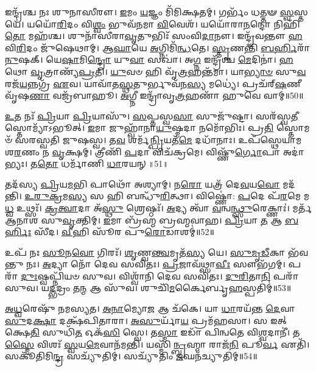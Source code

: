 𑌇𑌨𑍍𑌦𑍍𑌰᳴𑌶𑍍𑌚 𑌨𑌃 𑌶𑍁𑌨𑌾𑌸𑍀𑌰𑍗।
\-\ul{𑌇}\-𑌮𑌂 \ul{𑌯}\-𑌜𑍍𑌞𑌂 𑌮𑌿᳴𑌮𑌿𑌕𑍍𑌷𑌤𑌮𑍍।
𑌗𑌰𑍍𑌭𑌂᳴ 𑌧𑌤𑍍𑌤𑍟 \ul{𑌸𑍍𑌵}\-𑌸𑍍𑌤𑌯𑍇॑।
𑌯𑌯𑍋᳴\-\ul{𑌰𑌿}\-𑌦𑌂 𑌵𑌿\-\ul{𑌶𑍍𑌵𑌂} 𑌭𑍁𑌵᳴𑌨𑌮𑌾 \ul{𑌵𑌿}\-𑌵𑍇𑌶᳴।
𑌯𑌯𑍋᳴𑌰𑌾\-\ul{𑌨}\-𑌨𑍍𑌦𑍋 𑌨𑌿𑌹𑌿᳴\-\ul{𑌤𑍋} 𑌮𑌹᳴𑌶𑍍𑌚।
𑌶𑍁𑌨𑌾᳴𑌸𑍀𑌰𑌾\-\ul{𑌵𑍃}\-𑌤𑍁𑌭𑌿𑌃᳴ 𑌸𑌂𑌵𑌿\-\ul{𑌦𑌾}\-𑌨𑍗।
𑌇𑌨𑍍𑌦𑍍𑌰᳴𑌵𑌨𑍍𑌤𑍗 \ul{𑌹}\-𑌵𑌿\-\ul{𑌰𑌿}\-𑌦𑌂 𑌜𑍁᳴𑌷𑍇𑌥𑌾𑌮𑍍।
𑌆\-\ul{𑌘𑌾}\-𑌯𑍇 \ul{𑌅}\-𑌗𑍍𑌨𑌿𑌮𑌿᳴\-\ul{𑌨𑍍𑌧}\-𑌤𑍇।
\-\ul{𑌸𑍍𑌤𑍃}\-𑌣𑌨𑍍𑌤𑌿᳴ \ul{𑌬}\-\-\ul{𑌰𑍍}\-𑌹𑌿𑌰𑌾᳴\-\ul{𑌨𑍁}\-𑌷𑌕𑍍।
𑌯𑍇\-\ul{𑌷𑌾}\-𑌮𑌿\-\ul{𑌨𑍍𑌦𑍍𑌰𑍋} 𑌯𑍁\-\ul{𑌵𑌾} 𑌸𑌖𑌾॑।
𑌅\-\ul{𑌗𑍍𑌨} 𑌇𑌨𑍍𑌦𑍍𑌰᳴𑌶𑍍𑌚 \ul{𑌮𑍇}\-𑌦𑌿𑌨𑌾॑।
\-\ul{𑌹}\-𑌥𑍋 \ul{𑌵𑍃}\-𑌤𑍍𑌰𑌾𑌣𑍍𑌯᳴\-\ul{𑌪𑍍𑌰}\-𑌤𑌿।
\-\ul{𑌯𑍁}\-𑌵𑍞 𑌹𑌿 𑌵𑍃᳴\-\ul{𑌤𑍍𑌰}\-𑌹𑌨𑍍𑌤᳴𑌮𑌾।
𑌯𑌾\-\ul{𑌭𑍍𑌯𑌾}\-\-\ul{𑍞} 𑌸𑍁\-\ul{𑌵}\-𑌰𑌜᳴\-\ul{𑌯}\-𑌨𑍍𑌨𑌗𑍍𑌰᳴ \ul{𑌏}\-𑌵।
𑌯𑌾𑌵𑌾᳴𑌤\-\ul{𑌸𑍍𑌥}\-𑌤𑍁𑌰𑍍𑌭𑍁𑌵᳴𑌨\-\ul{𑌸𑍍𑌯} 𑌮𑌧𑍍𑌯𑍇॑।
𑌪𑍍𑌰𑌚᳴𑌰𑍍‌\mbox{}\-\ul{𑌷}\-𑌣𑍀 𑌵𑍃᳴𑌷\-\ul{𑌣𑌾} 𑌵𑌜𑍍𑌰᳴𑌬𑌾𑌹𑍂।
\-\ul{𑌅}\-𑌗𑍍𑌨𑍀 𑌇𑌨𑍍𑌦𑍍𑌰𑌾᳴𑌵𑍃\-\ul{𑌤𑍍𑌰}\-𑌹𑌣𑌾᳴ 𑌹𑍁𑌵𑍇 𑌵𑌾𑌮𑍍॥50॥\anuvakamend[𑌮\-\ul{𑌨} 𑌇\-\ul{𑌨𑍍𑌦𑍍𑌰𑍋} 𑌗𑌵𑌿᳴𑌷𑍍𑌟𑌿\-\ul{𑌷𑍁} 𑌤\-\ul{𑌨𑍍𑌤𑍁𑌂} 𑌗\-\ul{𑌰𑍍𑌭}\-\-\ul{𑍞} 𑌸𑍁𑌜𑌾᳴\-\ul{𑌤𑌾𑌃} 𑌸𑌖𑌾᳴ \ul{𑌸}\-𑌪𑍍𑌤 𑌚᳴]

\-\ul{𑌉}\-𑌤 𑌨𑌃᳴ \ul{𑌪𑍍𑌰𑌿}\-𑌯𑌾 \ul{𑌪𑍍𑌰𑌿}\-𑌯𑌾𑌸𑍁᳴।
\-\ul{𑌸}\-𑌪𑍍𑌤𑌸𑍍𑌵\-\ul{𑌸𑌾} 𑌸𑍁𑌜𑍁᳴𑌷𑍍𑌟𑌾।
𑌸𑌰᳴𑌸𑍍𑌵\-\ul{𑌤𑍀} 𑌸𑍍𑌤𑍋𑌮𑍍𑌯𑌾᳴\-𑌽𑌭𑍂𑌤𑍍।
\-\ul{𑌇}\-𑌮𑌾 𑌜𑍁𑌹𑍍𑌵𑌾᳴𑌨𑌾\-\ul{𑌯𑍁}\-𑌷𑍍𑌮𑌦𑌾 𑌨𑌮𑍋᳴𑌭𑌿𑌃।
𑌪𑍍𑌰\-\ul{𑌤𑌿} 𑌸𑍍𑌤𑍋𑌮𑍞᳴ 𑌸𑌰𑌸𑍍𑌵𑌤𑌿 𑌜𑍁𑌷𑌸𑍍𑌵।
𑌤\-\ul{𑌵} 𑌶𑌰𑍍𑌮᳴\-\ul{𑌨𑍍𑌪𑍍𑌰𑌿}\-𑌯𑌤᳴\-\ul{𑌮𑍇} 𑌦𑌧𑌾᳴𑌨𑌾𑌃।
𑌉𑌪᳴𑌸𑍍𑌥𑍇𑌯𑌾𑌮 𑌶\-\ul{𑌰}\-𑌣𑌂 𑌨 \ul{𑌵𑍃}\-𑌕𑍍𑌷𑌮𑍍।
𑌤𑍍𑌰𑍀𑌣𑌿᳴ \ul{𑌪}\-𑌦𑌾 𑌵𑌿𑌚᳴𑌕𑍍𑌰𑌮𑍇।
𑌵𑌿𑌷𑍍𑌣𑍁᳴\-\ul{𑌰𑍍𑌗𑍋}\-𑌪𑌾 𑌅𑌦𑌾॑𑌭𑍍𑌯𑌃।
𑌤\-\ul{𑌤𑍋} 𑌧𑌰𑍍𑌮𑌾᳴𑌣𑌿 \ul{𑌧𑌾}\-𑌰𑌯𑌨𑍍॥51॥

𑌤𑌦᳴𑌸𑍍𑌯 \ul{𑌪𑍍𑌰𑌿}\-𑌯\-\ul{𑌮}\-𑌭𑌿 𑌪𑌾𑌥𑍋᳴ 𑌅𑌶𑍍𑌯𑌾𑌮𑍍।
𑌨\-\ul{𑌰𑍋} 𑌯𑌤𑍍𑌰᳴ 𑌦𑍇\-\ul{𑌵}\-𑌯\-\ul{𑌵𑍋} 𑌮𑌦᳴𑌨𑍍𑌤𑌿।
\-\ul{𑌉}\-\-\ul{𑌰𑍁}\-\-\ul{𑌕𑍍𑌰}\-𑌮\-\ul{𑌸𑍍𑌯} 𑌸 𑌹𑌿 𑌬𑌨𑍍𑌧𑍁᳴\-\ul{𑌰𑌿}\-𑌤𑍍𑌥𑌾।
𑌵𑌿𑌷𑍍𑌣𑍋॑: \ul{𑌪}\-𑌦𑍇 𑌪᳴\-\ul{𑌰}\-𑌮𑍇 𑌮\-\ul{𑌧𑍍𑌵} 𑌉𑌥𑍍𑌸𑌃᳴।
\-\ul{𑌕𑍍𑌰}\-\-\ul{𑌤𑍍𑌵𑌾}\-𑌦𑌾 𑌅᳴\-\ul{𑌸𑍍𑌥𑍁} 𑌶𑍍𑌰𑍇𑌷𑍍𑌠𑌃᳴।
\-\ul{𑌅}\-𑌦𑍍𑌯 𑌤𑍍𑌵𑌾᳴ \ul{𑌵}\-𑌨𑍍𑌵\-\ul{𑌨𑍍𑌥𑍍𑌸𑍁}\-𑌰𑍇𑌕𑍍𑌣𑌾𑌃॑।
𑌮𑌰𑍍𑌤᳴ 𑌆𑌨𑌾𑌶 𑌸𑍁\-\ul{𑌵𑍃}\-𑌕𑍍𑌤𑌿𑌮𑍍।
\-\ul{𑌇}\-𑌮𑌾 𑌬𑍍𑌰᳴𑌹𑍍𑌮 𑌬𑍍𑌰𑌹𑍍𑌮𑌵𑌾𑌹।
\-\ul{𑌪𑍍𑌰𑌿}\-𑌯𑌾 \ul{𑌤} 𑌆 \ul{𑌬}\-\-\ul{𑌰𑍍}\-𑌹𑌿𑌃 𑌸𑍀᳴𑌦।
\-\ul{𑌵𑍀}\-𑌹𑌿 𑌸𑍂᳴𑌰 𑌪𑍁\-\ul{𑌰𑍋}\-𑌡𑌾𑌶𑌮𑍍॑॥52॥

𑌉𑌪᳴ 𑌨𑌃 \ul{𑌸𑍂}\-𑌨\-\ul{𑌵𑍋} 𑌗𑌿𑌰𑌃᳴।
\-\ul{𑌶𑍃}\-𑌣𑍍𑌵\-\ul{𑌨𑍍𑌤𑍍𑌵}\-𑌮𑍃𑌤᳴\-\ul{𑌸𑍍𑌯} 𑌯𑍇।
\-\ul{𑌸𑍁}\-\-\ul{𑌮𑍃}\-\-\ul{𑌡𑍀}\-𑌕𑌾 𑌭᳴𑌵𑌨𑍍𑌤𑍁 𑌨𑌃।
\-\ul{𑌅}\-𑌦𑍍𑌯𑌾 𑌨𑍋᳴ 𑌦𑍇𑌵 𑌸𑌵𑌿𑌤𑌃।
\-\ul{𑌪𑍍𑌰}\-𑌜𑌾𑌵᳴𑌥𑍍𑌸𑌾\-\ul{𑌵𑍀𑌃} 𑌸𑍗𑌭᳴𑌗𑌮𑍍।
𑌪𑌰𑌾᳴ \ul{𑌦𑍁𑌃}\-𑌷𑍍𑌵𑌪𑍍𑌨𑌿᳴𑌯𑍞 𑌸𑍁𑌵।
𑌵𑌿𑌶𑍍𑌵𑌾᳴𑌨𑌿 𑌦𑍇𑌵 𑌸𑌵𑌿𑌤𑌃।
\-\ul{𑌦𑍁}\-\-\ul{𑌰𑌿}\-𑌤𑌾\-\ul{𑌨𑌿} 𑌪𑌰𑌾᳴ 𑌸𑍁𑌵।
𑌯\-\ul{𑌦𑍍𑌭}\-𑌦𑍍𑌰𑌂 𑌤\-\ul{𑌨𑍍𑌮} 𑌆 𑌸𑍁᳴𑌵।
𑌶𑍁𑌚𑌿᳴\-\ul{𑌮}\-𑌰𑍍𑌕𑍈𑌰𑍍𑌬𑍃\-\ul{𑌹}\-𑌸𑍍𑌪𑌤𑌿𑌮𑍍॑॥53॥

\-\ul{𑌅}\-\-\ul{𑌧𑍍𑌵}\-𑌰𑍇𑌷𑍁᳴ 𑌨𑌮𑌸𑍍𑌯𑌤।
\-\ul{𑌅}\-\-\ul{𑌨𑌾}\-𑌮𑍍𑌯𑍋\-\ul{𑌜} 𑌆 𑌚᳴𑌕𑍇।
𑌯𑌾 \ul{𑌧𑌾}\-𑌰𑌯᳴𑌨𑍍𑌤 \ul{𑌦𑍇}\-𑌵𑌾 \ul{𑌸𑍁}\-𑌦\-\ul{𑌕𑍍𑌷𑌾} 𑌦𑌕𑍍𑌷᳴𑌪𑌿𑌤𑌾𑌰𑌾।
\-\ul{𑌅}\-\-\ul{𑌸𑍁}\-𑌰𑍍𑌯𑌾᳴\-\ul{𑌯} 𑌪𑍍𑌰𑌮᳴𑌹𑌸𑌾।
𑌸 𑌇𑌤𑍍 𑌕𑍍𑌷𑍇\-\ul{𑌤𑌿} 𑌸𑍁𑌧𑌿᳴\-\ul{𑌤} 𑌓𑌕᳴\-\ul{𑌸𑌿} 𑌸𑍍𑌵𑍇।
𑌤\-\ul{𑌸𑍍𑌮𑌾} 𑌇𑌡𑌾᳴ 𑌪𑌿𑌨𑍍𑌵𑌤𑍇 𑌵𑌿\-\ul{𑌶𑍍𑌵}\-𑌦𑌾𑌨𑍀॑।
𑌤\-\ul{𑌸𑍍𑌮𑍈} 𑌵𑌿𑌶𑌃᳴ \ul{𑌸𑍍𑌵}\-𑌯\-\ul{𑌮𑍇}\-𑌵𑌾𑌨᳴𑌮𑌨𑍍𑌤𑌿।
𑌯𑌸𑍍𑌮𑌿᳴\-\ul{𑌨𑍍𑌬𑍍𑌰}\-𑌹𑍍𑌮𑌾 𑌰𑌾𑌜᳴\-\ul{𑌨𑌿} 𑌪𑍂\-\ul{𑌰𑍍𑌵} 𑌏𑌤𑌿᳴।
𑌸𑌕𑍂᳴𑌤𑌿𑌮𑌿\-\ul{𑌨𑍍𑌦𑍍𑌰} 𑌸𑌚𑍍𑌯𑍁᳴𑌤𑌿𑌮𑍍।
𑌸𑌚𑍍𑌯𑍁᳴𑌤𑌿𑌂 \ul{𑌜}\-𑌘𑌨᳴𑌚𑍍𑌯𑍁𑌤𑌿𑌮𑍍॥54॥

